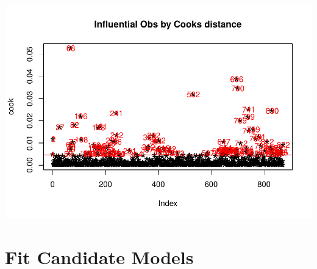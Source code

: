 \documentclass[
]{article}
\begin{document}
\includegraphics{SCMU_egg_model_files/figure-latex/cook-1.pdf}

\hypertarget{fit-candidate-models}{%
\section{Fit Candidate Models}\label{fit-candidate-models}}
\end{document}
